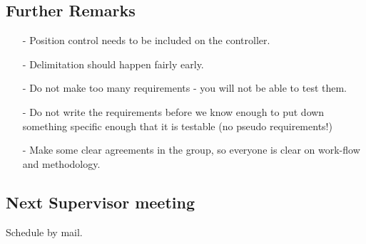 \subsection{Further Remarks}
\begin{itemize}
\item[-] Position control needs to be included on the controller.
\item[-] Delimitation should happen fairly early.
\item[-] Do not make too many requirements - you will not be able to test them.
\item[-] Do not write the requirements before we know enough to put down something specific enough that it is testable (no pseudo requirements!)
\item[-] Make some clear agreements in the group, so everyone is clear on work-flow and methodology.
\end{itemize}

\subsection{Next Supervisor meeting}
Schedule by mail.



